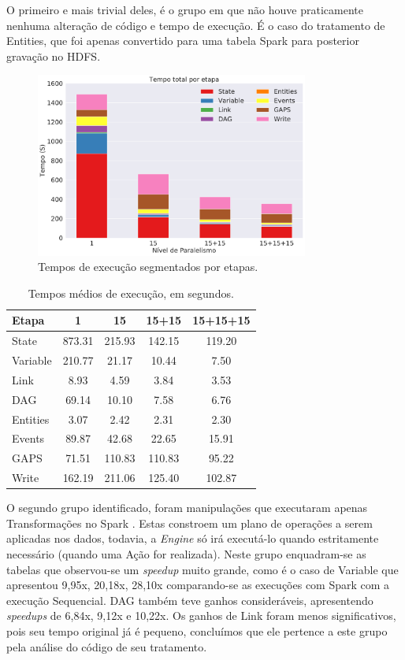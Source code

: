 O primeiro e mais trivial deles, é o grupo em que não houve praticamente 
nenhuma alteração de código e tempo de execução. É o caso do tratamento de 
Entities, que foi apenas convertido para uma tabela Spark para posterior 
gravação no HDFS.

\begin{figure}[H]
\centerline{
\includegraphics[width=0.8\textwidth]{./img/total_step.pdf}}
 \caption{Tempos de execução segmentados por etapas.}
 \label{fig:total_step}
\end{figure}


\begin{table}[ht]
\centering
\begin{tabular}{l c c c c} \toprule
\textbf{Etapa}  & \textbf{1} & \textbf{15} & \textbf{15+15} & 
\textbf{15+15+15}\\ 
\midrule
State		& 873.31 & 215.93 & 142.15 & 119.20\\
Variable  	& 210.77 & 21.17  & 10.44  & 7.50 \\
Link      	& 8.93   & 4.59   & 3.84   & 3.53 \\
DAG        	& 69.14  & 10.10  & 7.58   & 6.76 \\
Entities	& 3.07   & 2.42   & 2.31   & 2.30 \\
Events		& 89.87  & 42.68  & 22.65  & 15.91\\
GAPS		& 71.51  & 110.83 & 110.83 & 95.22\\
Write		& 162.19 & 211.06 & 125.40 & 102.87\\
\end{tabular}
\caption{Tempos médios de execução, em segundos.}
\label{tab:total_step}
\end{table}

O segundo grupo identificado, foram manipulações que executaram apenas 
Transformações no Spark \cite{ref:sparkbook}. Estas constroem um plano de 
operações a serem aplicadas nos dados, todavia, a \emph{Engine} só irá 
executá-lo quando estritamente necessário (quando uma Ação for realizada). 
Neste grupo enquadram-se as tabelas que observou-se um \emph{speedup} muito 
grande, como é o caso de Variable que apresentou 9,95x, 20,18x, 28,10x 
comparando-se as execuções com Spark com a execução Sequencial. DAG também teve 
ganhos consideráveis, apresentendo \emph{speedups} de 6,84x, 9,12x e 10,22x. Os 
ganhos de Link foram menos significativos, pois seu tempo original já é pequeno, 
concluímos que ele pertence a este grupo pela análise do código de seu 
tratamento.

